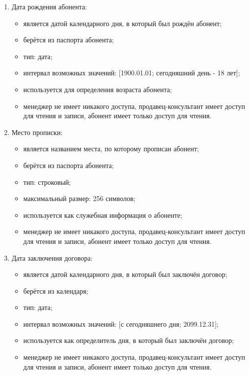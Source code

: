 \begin{enumerate}
\begin{enumerate}
        \item Дата рождения абонента:
        \begin{itemize}
            \item является датой календарного дня, в который был рождён абонент;
            \item берётся из паспорта абонента;
            \item тип: дата;
            \item интервал возможных значений: [1900.01.01; сегодняшний день - 18 лет];
            \item используется для определения возраста абонента;
            \item менеджер не имеет никакого доступа, продавец-консультант имеет доступ для чтения и записи, абонент имеет только доступ для чтения.
        \end{itemize}

        \item Место прописки:
        \begin{itemize}
            \item является названием места, по которому прописан абонент;
            \item берётся из паспорта абонента;
            \item тип: строковый;
            \item максимальный размер: 256 символов;
            \item используется как служебная информация о абоненте;
            \item менеджер не имеет никакого доступа, продавец-консультант имеет доступ для чтения и записи, абонент имеет только доступ для чтения.
        \end{itemize}

        \item Дата заключения договора:
        \begin{itemize}
            \item является датой календарного дня, в который был заключён договор;
            \item берётся из календаря;
            \item тип: дата;
            \item интервал возможных значений: [с сегодняшнего дня; 2099.12.31];
            \item используется как определитель дня, в который был заключён договор;
            \item менеджер не имеет никакого доступа, продавец-консультант имеет доступ для чтения и записи, абонент имеет только доступ для чтения.
        \end{itemize}


\end{enumerate}
\end{enumerate}
